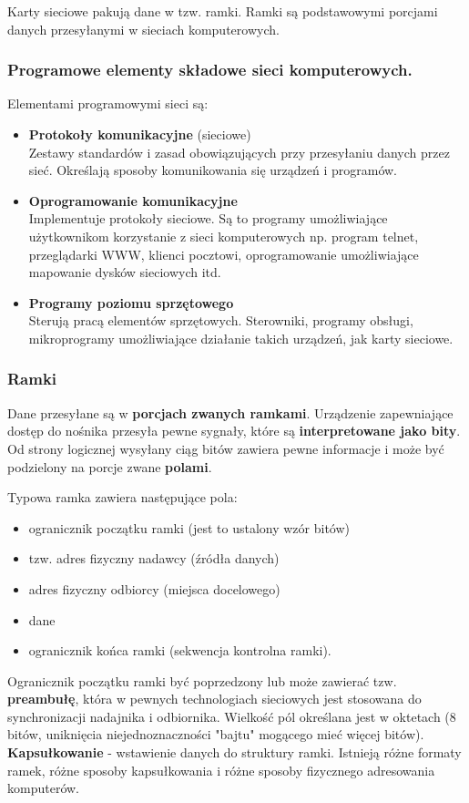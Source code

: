 \documentclass[a4paper]{article}
\begin{document}
Karty	sieciowe	pakują	dane	w	tzw.	ramki. Ramki	są	podstawowymi	porcjami	danych	przesyłanymi	w	sieciach	komputerowych.


\subsubsection{Programowe	elementy	składowe	sieci	komputerowych.}
Elementami	programowymi	sieci	są:
\begin{itemize}
    \item \textbf{Protokoły	 komunikacyjne} (sieciowe)\\
    Zestawy standardów i zasad obowiązujących przy	 przesyłaniu danych	przez	sieć. Określają sposoby komunikowania się urządzeń	i	programów.
    \item \textbf{Oprogramowanie	komunikacyjne}\\
    Implementuje protokoły sieciowe. Są to programy	 umożliwiające	 użytkownikom	 korzystanie	 z
    sieci	 komputerowych	 np. program telnet, przeglądarki WWW, klienci pocztowi, oprogramowanie	umożliwiające mapowanie	dysków	sieciowych	itd.
    \item \textbf{Programy	 poziomu	 sprzętowego}\\
    Sterują pracą elementów	 sprzętowych. Sterowniki, programy	 obsługi, mikroprogramy umożliwiające	działanie	takich	urządzeń,	jak	karty	sieciowe.
\end{itemize}

\subsubsection{Ramki}
Dane przesyłane są w \textbf{porcjach zwanych ramkami}. Urządzenie	zapewniające dostęp	do nośnika przesyła	pewne sygnały, które są \textbf{interpretowane jako bity}. Od strony	logicznej wysyłany	ciąg bitów zawiera	pewne informacje i może	być	podzielony na porcje zwane \textbf{polami}.

Typowa ramka zawiera następujące pola:
\begin{itemize}
    \item ogranicznik początku ramki (jest	to	ustalony	wzór	bitów)
    \item tzw.	adres fizyczny nadawcy (źródła	danych)
    \item adres	fizyczny odbiorcy (miejsca	docelowego)
    \item dane
    \item ogranicznik końca	ramki (sekwencja	kontrolna	ramki).
\end{itemize}
Ogranicznik	 początku ramki być poprzedzony lub może zawierać tzw. \textbf{preambułę}, która w pewnych technologiach sieciowych jest stosowana do synchronizacji nadajnika i
odbiornika. Wielkość pól określana jest w oktetach (8 bitów, uniknięcia niejednoznaczności "bajtu" mogącego mieć więcej bitów). \textbf{Kapsułkowanie} - wstawienie danych do struktury ramki. Istnieją różne formaty ramek, różne sposoby kapsułkowania i różne sposoby fizycznego adresowania komputerów.
\end{document}
